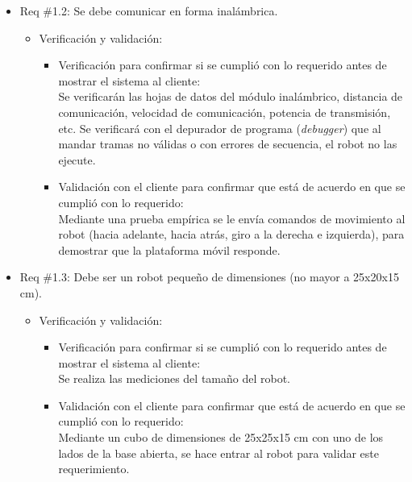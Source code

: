 \documentclass[11pt]{charter}
\begin{document}
\begin{itemize} 
\item Req \#1.2: Se debe comunicar en forma inalámbrica.
\begin{itemize} 
\item Verificación y validación:
	\begin{itemize}
	\item Verificación para confirmar si se cumplió con lo requerido 	antes de mostrar el sistema al cliente:\\
	Se verificarán las hojas de datos del módulo inalámbrico, 
	distancia de comunicación, velocidad de comunicación, potencia
	de transmisión, etc. Se verificará con el depurador de programa
	(\textit{debugger}) que al mandar tramas no válidas o con errores 
	de secuencia, el robot no las ejecute.
	\item Validación con el cliente para confirmar que está de 				acuerdo en que se cumplió con lo requerido:\\
	Mediante una prueba empírica se le envía comandos de movimiento
	al robot (hacia adelante, hacia atrás, giro a la derecha e
	izquierda), para demostrar que la plataforma móvil responde.
\end{itemize}
	
	\end{itemize}
\end{itemize}

\begin{itemize} 
\item Req \#1.3: Debe ser un robot pequeño de dimensiones (no mayor a 25x20x15 cm).
\begin{itemize} 
\item Verificación y validación:
	\begin{itemize}
	\item Verificación para confirmar si se cumplió con lo requerido 	antes de mostrar el sistema al cliente:\\
	Se realiza las mediciones del tamaño del robot.  
	\item Validación con el cliente para confirmar que está de 				acuerdo en que se cumplió con lo requerido:\\
	Mediante un cubo de dimensiones de 25x25x15 cm con uno de los
	lados de la base abierta, se hace entrar al robot para validar
	este requerimiento.  
	\end{itemize}
\end{itemize}
\end{itemize}
\end{document}

